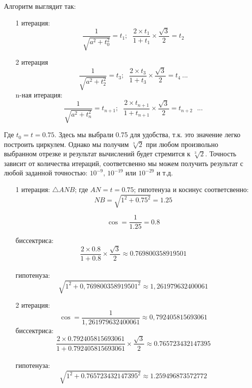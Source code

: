 \documentclass[12pt, letterpaper, oneside]{report}
\begin{document}
Алгоритм выглядит так:
\begin{enumerate}
\item[1] итерация:
\begin{equation}
\dfrac{1}{\sqrt{a^{2}+t_{0}^{2}}}=t_{1};\ \hspace{5pt} \frac{2\times t_{1}}{1+t_{1}}\times\frac{\sqrt{3}}{2}=t_{2}
\end{equation}
\item[2] итерация
\begin{equation}
 \dfrac{1}{\sqrt{a^{2}+t_{2}^{2}}}=t_{3};\ \hspace{5pt} \frac{2\times t_{3}}{1+t_{3}}\times\frac{\sqrt{3}}{2}=t_{4} \ ...
\end{equation}
\subitem n-ная итерация:
\begin{equation}
\dfrac{1}{\sqrt{a^{2}+t_{n}^{2}}}=t_{n+1};\ \hspace{5pt} \frac{2\times t_{n+1}}{1+t_{n+1}}\times\frac{\sqrt{3}}{2}=t_{n+2} \ \hspace{5pt} ...
\end{equation}
\end{enumerate}
Где $t_{0}=t=0.75$. Здесь мы выбрали 0.75 для удобства, т.к. это значение легко построить циркулем. Однако мы получим $\sqrt[3]{2}$ при любом произвольно выбранном отрезке и результат вычислений будет стремится к $\sqrt[3]{2}$. Точность зависит от количества итераций, соответсвенно мы можем получить результат с любой заданной точностью: $10^{-9}$, $10^{-19}$ или $10^{-29}$ и т.д.
\begin{enumerate}

\item[1] итерация: $\triangle ANB$;  где $AN=t=0.75$; гипотенуза и косинус соответсвенно:
\begin{equation}
 NB=\sqrt{1^{2}+0.75^{2}}=1.25
 \end{equation}

\begin{equation}
\cos=\dfrac{1}{1.25}=0.8
\end{equation}

биссектриса:
\begin{equation}
 \frac{2\times0.8}{1+0.8}\times\frac{\sqrt{3}}{2}\approx 0.769800358919501
\end{equation}
\\
гипотенуза:
\begin{equation}
\sqrt{1^{2}+0,769800358919501^{2}}\approx 1,261979632400061
\end{equation}
\item[2] итерация:
\begin{equation}
\cos=\dfrac{1}{1,261979632400061}\approx0,792405815693061
\end{equation}
биссектриса:
\begin{equation}
\frac{2\times 0.792405815693061}{1+0.792405815693061}\times\frac{\sqrt{3}}{2}\approx 0.765723432147395
\end{equation}
\\
гипотенуза:
\begin{equation}
\sqrt{1^{2}+0.765723432147395^{2}}\approx 1.259496873572772
\end{equation}
\end{enumerate}
\end{document}
